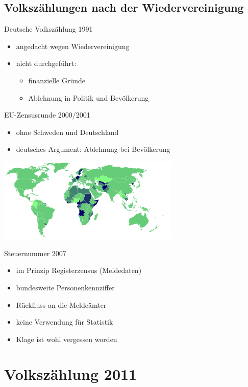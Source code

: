 \documentclass[ignorenonframetext,ucs]{beamer}
\begin{document}
\subsection{Volkszählungen nach der Wiedervereinigung}

\begin{frame}{Deutsche Volkszählung 1991}\begin{itemize}
\item angedacht wegen Wiedervereinigung
\item nicht durchgeführt:\begin{itemize}
	\item finanzielle Gründe
	\item Ablehnung in Politik und Bevölkerung
\end{itemize}
\end{itemize}\end{frame}

\begin{frame}{EU-Zensusrunde 2000/2001}\begin{itemize}
\item ohne Schweden und Deutschland
\item deutsches Argument: Ablehnung bei Bevölkerung
\end{itemize}
\includegraphics[height=4cm]{most-recent-census.png}
\end{frame}

\begin{frame}{Steuernummer 2007}\begin{itemize}
\item im Prinzip Registerzensus (Meldedaten)
\item bundesweite Personenkennziffer
\item Rückfluss an die Meldeämter
\item keine Verwendung für Statistik
\item Klage ist wohl vergessen worden
\end{itemize}\end{frame}

\section{Volkszählung 2011}
\end{document}
